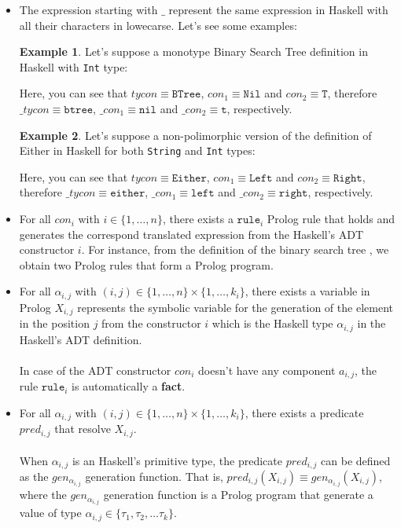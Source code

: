 \documentclass{report}
\theoremstyle{definition}
\newtheorem{example}{Example}[section]
\theoremstyle{definition}
\newcommand{\ttt}[1]{\texttt{#1}}
\begin{document}
\begin{itemize}
	\item The expression starting with $\_$ represent the same expression in Haskell with all their characters in lowecarse. Let's see some examples:
	      	      
		\begin{example}
			Let's suppose a monotype Binary Search Tree definition in Haskell with \ttt{Int} type:
			
			Here, you can see that $tycon \equiv \ttt{BTree}$, $con_1 \equiv \ttt{Nil}$ and $con_2 \equiv \ttt{T}$, therefore $\_tycon \equiv \ttt{btree}$, $\_con_1 \equiv \ttt{nil}$ and $\_con_2 \equiv \ttt{t}$, respectively.
		\end{example}
		\begin{example}
			Let's suppose a non-polimorphic version of the definition of Either in Haskell for both \ttt{String} and \ttt{Int} types:
			
			Here, you can see that $tycon \equiv \ttt{Either}$, $con_1 \equiv \ttt{Left}$ and $con_2 \equiv \ttt{Right}$, therefore $\_tycon \equiv \ttt{either}$, $\_con_1 \equiv \ttt{left}$ and $\_con_2 \equiv \ttt{right}$, respectively.
		\end{example}
	      
	\item For all $con_i$ with $i \in \{1, \ldots, n \}$, there exists a $\ttt{rule}_i$ Prolog rule that holds and generates the correspond translated expression from the Haskell's ADT constructor $i$. For instance, from the definition of the binary search tree , we obtain two Prolog rules that form a Prolog program.
	\item For all $\alpha_{i,j}$ with $(i,j) \in \{1, \ldots, n \} \times \{1, \ldots, k_i \}$, there exists a variable in Prolog $X_{i,j}$ represents the symbolic variable for the generation of the element in the position $j$ from the constructor $i$ which is the Haskell type $\alpha_{i,j}$ in the Haskell's ADT definition.\\\\
	In case of the ADT constructor $con_i$ doesn't have any component $a_{i,j}$, the rule $\ttt{rule}_i$ is automatically a \textbf{fact}.

	\item For all $\alpha_{i,j}$ with $(i,j) \in \{1, \ldots, n \} \times \{1, \ldots, k_i \}$, there exists a predicate $pred_{i,j}$ that resolve $X_{i,j}$.\\\\
	When $\alpha_{i,j}$ is an Haskell's primitive type, the predicate $pred_{i,j}$ can be defined as the $gen_{\alpha_{i,j}}$ generation function. That is, $pred_{i,j}(X_{i,j}) \equiv gen_{\alpha_{i,j}}(X_{i,j})$, where the $gen_{\alpha_{i,j}}$ generation function is a Prolog program that generate a value of type $\alpha_{i,j} \in \{ \tau_1 , \tau_2, \ldots \tau_k \}$.

\end{itemize}
\end{document}
